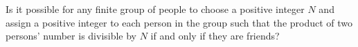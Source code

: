 Is it possible for any finite group of people to choose a positive integer $N$ and assign a positive integer to each person in the group such that the product of two persons' number is divisible by $N$ if and only if they are friends?